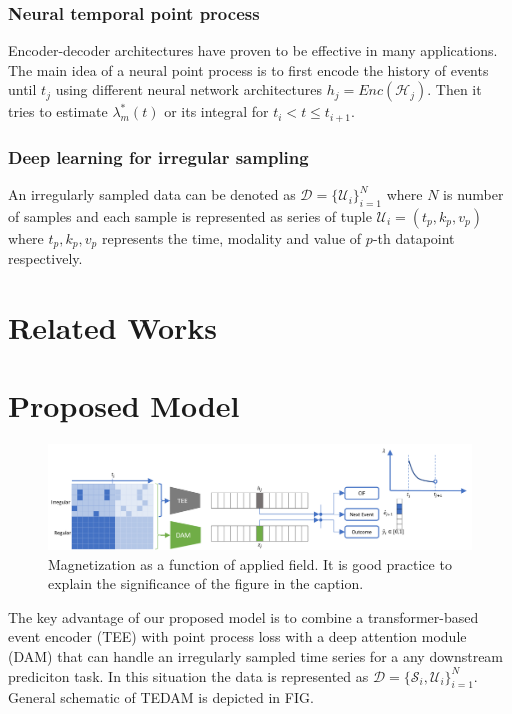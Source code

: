\documentclass[journal,twoside,web]{ieeecolor}
\begin{document}
\subsubsection{Neural temporal point process}

Encoder-decoder architectures have proven to be effective in many applications. The main idea of a neural point process is to first encode the history of events until $t_j$ using different neural network architectures $h_j=Enc(\mathcal{H}_j)$. Then it tries to estimate $\lambda^*_m(t)$ or its integral for $ t_i < t \leq t_{i+1}$.


\subsubsection{Deep learning for irregular sampling}
An irregularly sampled data can be denoted as $\mathcal{D}=\{\mathcal{U}_i\}_{i=1}^{N}$ where $N$ is number of samples and each sample is represented as series of tuple $\mathcal{U}_i={(t_p,k_p,v_p)}$ where $t_p, k_p, v_p$ represents the time, modality and value of $p$-th datapoint respectively.

\section{Related Works}
\label{sec:Related Works}

\section{Proposed Model}
\label{sec:Proposed Model}


\begin{figure}[!t]
\centerline{\includegraphics{images/model_arch.png}}
\caption{Magnetization as a function of applied field.
It is good practice to explain the significance of the figure in the caption.}
\label{fig1}
\end{figure}

 The key advantage of our proposed model is to combine a  transformer-based event encoder (TEE) with point process loss with a deep attention module (DAM) that can handle an irregularly sampled time series for a any downstream prediciton task. In this situation the data is represented as $\mathcal{D}=\{\mathcal{S}_i,\mathcal{U}_i\}_{i=1}^{N}$. General schematic of TEDAM is depicted in FIG.
\end{document}
